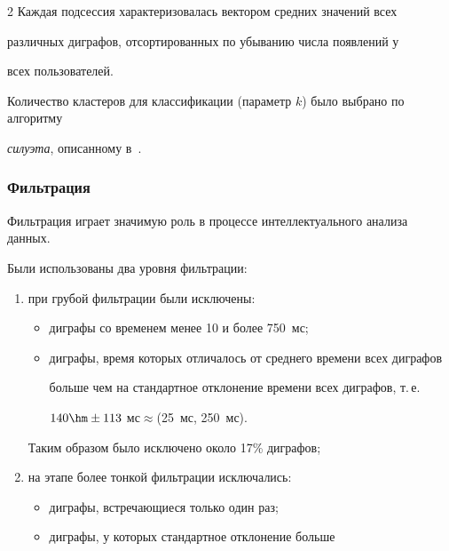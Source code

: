 \begin{multicols}{2}
Каждая подсессия характеризовалась вектором средних значений всех

различных диграфов, отсортированных по убыванию числа появлений у

всех пользователей.



Количество кластеров для классификации (параметр $k$) было выбрано по алгоритму 

\textit{силуэта}, описанному в~\cite{sil}.



\subsubsection{Фильтрация}



Фильтрация играет значимую роль в процессе интеллектуального анализа данных. 

Были использованы два уровня фильтрации:

\begin{enumerate}[(1)]

    \item при грубой фильтрации были исключены:

    \begin{itemize}

        \item[(а)] диграфы со временем менее 10 и более 750~мс;

        \item[(б)] диграфы, время которых отличалось от среднего времени всех диграфов 

        больше чем на стандартное отклонение времени всех диграфов, т.\,е.\ 

        $140\hm\pm 113~$мс\;$\approx$\;(25~мс, 250~мс).

    \end{itemize}

     Таким образом было исключено около 17\% диграфов;

    \item на этапе более тонкой фильтрации исключались:

    \begin{itemize}

        \item[(а)] диграфы, встречающиеся только один раз;

        \item[(б)] диграфы, у которых стандартное отклонение больше 


\end{itemize}
\end{enumerate}
\end{multicols}
